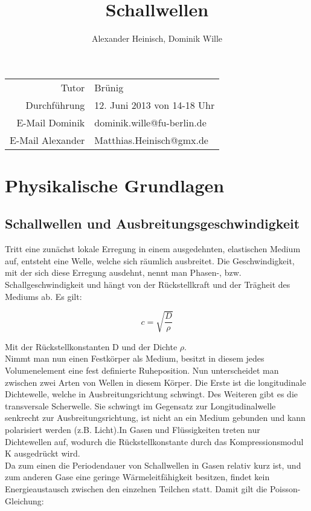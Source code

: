 \documentclass{article}
\title{Schallwellen}
\author{Alexander Heinisch, Dominik Wille}
\begin{document}
\maketitle

{\begin{center}
\begin{minipage}{\linewidth}
\centering
\label{wtd}
\end{minipage}
\end{center}

\vspace{7cm}
\noindent
\begin{center}
\begin{tabular}{r l}
Tutor & Brünig\\
Durchführung & 12. Juni 2013 von 14-18 Uhr \\

E-Mail Dominik & dominik.wille@fu-berlin.de \\
E-Mail Alexander & Matthias.Heinisch@gmx.de \\
\end{tabular}
\end{center}

\newpage
\tableofcontents
\newpage

\section{Physikalische Grundlagen}
\subsection{Schallwellen und Ausbreitungsgeschwindigkeit}
Tritt eine zunächst lokale Erregung in einem ausgedehnten, elastischen Medium auf, entsteht eine Welle, welche sich räumlich ausbreitet. Die Geschwindigkeit, mit der sich diese Erregung ausdehnt, nennt man Phasen-, bzw. Schallgeschwindigkeit und hängt von der Rückstellkraft und der Trägheit des Mediums ab. Es gilt:

\begin{equation}
\label{c}
c=\sqrt{\frac{D}{\rho}}
\end{equation}

Mit der Rückstellkonstanten D und der Dichte \(\rho\).\\
Nimmt man nun einen Festkörper als Medium, besitzt in diesem jedes Volumenelement eine fest definierte Ruheposition. Nun unterscheidet man zwischen zwei Arten von Wellen in diesem Körper. Die Erste ist die longitudinale Dichtewelle, welche in Ausbreitungsrichtung schwingt. Des Weiteren gibt es die transversale Scherwelle. Sie schwingt im Gegensatz zur Longitudinalwelle senkrecht zur Ausbreitungsrichtung, ist nicht an ein Medium gebunden und kann polarisiert werden (z.B. Licht).In Gasen und Flüssigkeiten treten nur Dichtewellen auf, wodurch die Rückstellkonstante durch das Kompressionsmodul K ausgedrückt wird.\\
Da zum einen die Periodendauer von Schallwellen in Gasen relativ kurz ist, und zum anderen Gase eine geringe Wärmeleitfähigkeit besitzen, findet kein Energieaustausch zwischen den einzelnen Teilchen statt. Damit gilt die Poisson-Gleichung:

}
\end{document}

